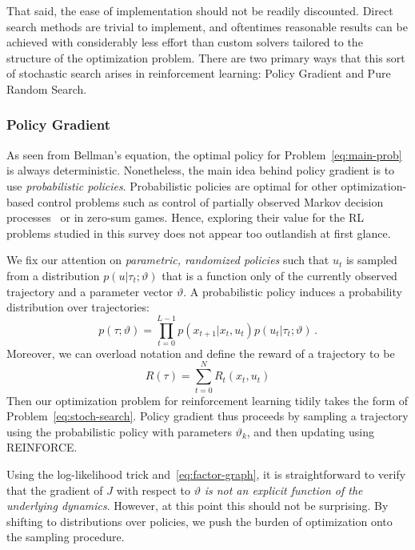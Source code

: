 \documentclass[11pt]{article}
\newcommand{\eq}[1]{\eqref{eq:#1}}
\newcommand{\eqd}[1]{\eqref{eq:#1}}
\numberwithin{equation}{section}
\begin{document}
That said, the ease of implementation should not be readily discounted. Direct search methods are trivial to implement, and oftentimes reasonable results can be achieved with considerably less effort than custom solvers tailored to the structure of the optimization problem. There are two primary ways that this sort of stochastic search arises in reinforcement learning: Policy Gradient and Pure Random Search.

\subsubsection{Policy Gradient}

As seen from Bellman's equation, the optimal policy for Problem~\eqd{main-prob} is always deterministic. Nonetheless, the main idea behind policy gradient is to use \emph{probabilistic policies}. Probabilistic policies are optimal for other optimization-based control problems such as control of partially observed Markov decision processes~\cite{aastrom1965optimal,kaelbling1998planning} or in zero-sum games. Hence, exploring their value for the RL problems studied in this survey does not appear too outlandish at first glance.

We fix our attention on \emph{parametric, randomized policies} such that $u_t$ is sampled from a distribution $p(u \vert \tau_t;\vartheta)$ that is a function only of the currently observed trajectory and a parameter vector $\vartheta$. A probabilistic policy induces a probability distribution over trajectories:
\begin{equation}\label{eq:factor-graph}
	p(\tau;\vartheta) = \prod_{t=0}^{L-1} p(x_{t+1} \vert x_{t},u_{t}) p(u_t \vert \tau_t ;\vartheta)\,.
\end{equation}
Moreover, we can overload notation and define the reward of a trajectory to be
\begin{equation*}
	R(\tau) = \sum_{t=0}^N R_t(x_t,u_t)
\end{equation*}
Then our optimization problem for reinforcement learning tidily takes the form of Problem~\eqd{stoch-search}. Policy gradient thus proceeds by sampling a trajectory using the probabilistic policy with parameters $\vartheta_k$, and then updating using REINFORCE.


Using the log-likelihood trick and~\eq{factor-graph}, it is straightforward to verify that the gradient of $J$ with respect to $\vartheta$ \emph{is not an explicit function of the underlying dynamics}.  However, at this point this should not be surprising. By shifting to distributions over policies, we push the burden of optimization onto the sampling procedure. 
\end{document}
